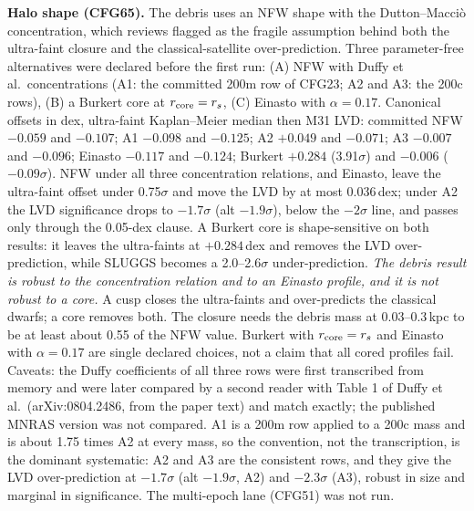 \documentclass[10pt]{article}
\begin{document}
\textbf{Halo shape (CFG65).} The debris uses an NFW shape with the Dutton--Macci\`o concentration, which reviews flagged as the fragile assumption behind both the ultra-faint closure and the classical-satellite over-prediction. Three parameter-free alternatives were declared before the first run: (A) NFW with Duffy et al.\ concentrations (A1: the committed 200m row of CFG23; A2 and A3: the 200c rows), (B) a Burkert core at $r_{\rm core}=r_s$, (C) Einasto with $\alpha=0.17$. Canonical offsets in dex, ultra-faint Kaplan--Meier median then M31 LVD: committed NFW $-0.059$ and $-0.107$; A1 $-0.098$ and $-0.125$; A2 $+0.049$ and $-0.071$; A3 $-0.007$ and $-0.096$; Einasto $-0.117$ and $-0.124$; Burkert $+0.284$ (3.91$\sigma$) and $-0.006$ ($-0.09\sigma$). NFW under all three concentration relations, and Einasto, leave the ultra-faint offset under 0.75$\sigma$ and move the LVD by at most 0.036\,dex; under A2 the LVD significance drops to $-1.7\sigma$ (alt $-1.9\sigma$), below the $-2\sigma$ line, and passes only through the 0.05-dex clause. A Burkert core is shape-sensitive on both results: it leaves the ultra-faints at $+0.284$\,dex and removes the LVD over-prediction, while SLUGGS becomes a 2.0--2.6$\sigma$ under-prediction. \emph{The debris result is robust to the concentration relation and to an Einasto profile, and it is not robust to a core.} A cusp closes the ultra-faints and over-predicts the classical dwarfs; a core removes both. The closure needs the debris mass at 0.03--0.3\,kpc to be at least about 0.55 of the NFW value. Burkert with $r_{\rm core}=r_s$ and Einasto with $\alpha=0.17$ are single declared choices, not a claim that all cored profiles fail. Caveats: the Duffy coefficients of all three rows were first transcribed from memory and were later compared by a second reader with Table 1 of Duffy et al.\ (arXiv:0804.2486, from the paper text) and match exactly; the published MNRAS version was not compared. A1 is a 200m row applied to a 200c mass and is about 1.75 times A2 at every mass, so the convention, not the transcription, is the dominant systematic: A2 and A3 are the consistent rows, and they give the LVD over-prediction at $-1.7\sigma$ (alt $-1.9\sigma$, A2) and $-2.3\sigma$ (A3), robust in size and marginal in significance. The multi-epoch lane (CFG51) was not run.
\end{document}
